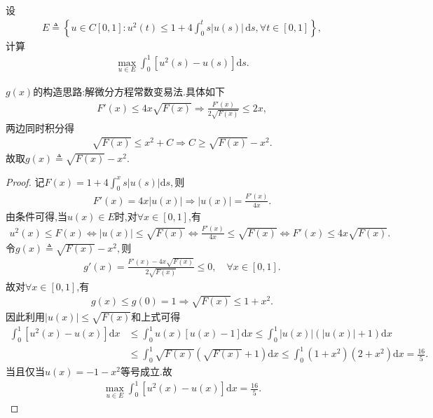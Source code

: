 \documentclass[../../main.tex]{subfiles}%
\begin{document}
\begin{example}
设
\begin{align*}
E \triangleq \left\{ u \in C[0,1] : u^2(t) \leqslant 1 + 4 \int_0^t s|u(s)| \, \mathrm{d}s, \forall t \in [0,1] \right\},
\end{align*}
计算
\begin{align*}
\max_{u \in E} \int_0^1 \left[ u^2(s) - u(s) \right] \mathrm{d}s.
\end{align*}
\end{example}
\begin{note}
$g(x)$的构造思路:解微分方程常数变易法.具体如下
\begin{align*}
F'(x) \leqslant 4x\sqrt{F(x)} \Longrightarrow \frac{F'(x)}{2\sqrt{F(x)}} \leqslant 2x,
\end{align*}
两边同时积分得
\begin{align*}
\sqrt{F(x)} \leqslant x^2 + C \Longrightarrow C \geqslant \sqrt{F(x)} - x^2.
\end{align*}
故取$g(x) \triangleq \sqrt{F(x)} - x^2.$
\end{note}
\begin{proof}

记$F(x) = 1 + 4\int_0^x s|u(s)|\mathrm{d}s,$则
\begin{align*}
F'(x) = 4x|u(x)| \Longrightarrow |u(x)| = \frac{F'(x)}{4x}.
\end{align*}
由条件可得,当$u(x) \in E$时,对$\forall x \in [0,1]$,有
\begin{align*}
u^2(x) \leqslant F(x) \Longleftrightarrow |u(x)| \leqslant \sqrt{F(x)} \Longleftrightarrow \frac{F'(x)}{4x} \leqslant \sqrt{F(x)} \Longleftrightarrow F'(x) \leqslant 4x\sqrt{F(x)}.
\end{align*}
令$g(x) \triangleq \sqrt{F(x)} - x^2,$则
\begin{align*}
g'(x) = \frac{F'(x) - 4x\sqrt{F(x)}}{2\sqrt{F(x)}} \leqslant 0, \quad \forall x \in [0,1].
\end{align*}
故对$\forall x \in [0,1]$,有
\begin{align*}
g(x) \leqslant g(0) = 1 \Longrightarrow \sqrt{F(x)} \leqslant 1 + x^2.
\end{align*}
因此利用$|u(x)| \leqslant \sqrt{F(x)}$和上式可得
\begin{align*}
\int_0^1 \left[ u^2(x) - u(x) \right] \mathrm{d}x &\leqslant \int_0^1 u(x) \left[ u(x) - 1 \right] \mathrm{d}x \leqslant \int_0^1 |u(x)| \left( |u(x)| + 1 \right) \mathrm{d}x \\
&\leqslant \int_0^1 \sqrt{F(x)} \left( \sqrt{F(x)} + 1 \right) \mathrm{d}x \leqslant \int_0^1 \left( 1 + x^2 \right) \left( 2 + x^2 \right) \mathrm{d}x = \frac{16}{5}.
\end{align*}
当且仅当$u(x) = -1 - x^2$等号成立.故
\begin{align*}
\max_{u \in E} \int_0^1 \left[ u^2(x) - u(x) \right] \mathrm{d}x = \frac{16}{5}.
\end{align*}

\end{proof}
\end{document}
